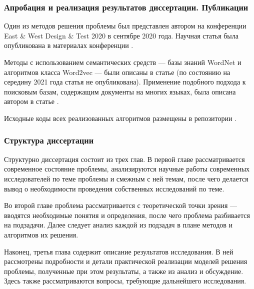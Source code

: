 \subsubsection{Апробация и реализация результатов диссертации. Публикации}
Один из методов решения проблемы был представлен автором на конференции East \& West Design \& Test 2020 в сентябре 2020 года.
Научная статья была опубликована в материалах конференции \cite{9224840}.

Методы с использованием семантических средств --- базы знаний WordNet и алгоритмов класса Word2vec --- были описаны в статье 
\cite{art1} (по состоянию на середину 2021 года статья не опубликована). Применение подобного подхода к поисковым базам,
содержащим документы на многих языках, была описана автором в статье \cite{art2}.

Исходные коды всех реализованных алгоритмов размещены в репозитории \cite{source-repo}.

\subsubsection{Структура диссертации}
Структурно диссертация состоит из трех глав. В первой главе рассматривается современное состояние проблемы, анализируются
научные работы современных исследователей по теме проблемы и смежным с ней темам, после чего делается вывод о необходимости
проведения собственных исследований по теме.

Во второй главе проблема рассматривается с теоретической точки зрения --- вводятся необходимые понятия и определения, после чего
проблема разбивается на подзадачи. Далее следует анализ каждой из подзадач в плане методов и алгоритмов их решения.

Наконец, третья глава содержит описание результатов исследования. В ней рассмотрены подробности и детали практической реализации
моделей решения проблемы, полученные при этом результаты, а также из анализ и обсуждение. Здесь также рассматриваются вопросы,
требующие дальнейшего исследования.